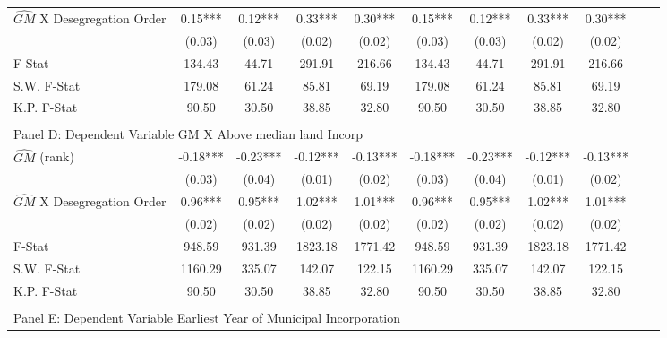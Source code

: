 \begin{table}[htbp]
\begin{threeparttable}
\begin{tabular}{l*{10}{c}}
\addlinespace
$\hat{GM}$ X Desegregation Order&       0.15***&       0.12***&       0.33***&       0.30***&       0.15***&       0.12***&       0.33***&       0.30***\\
                &     (0.03)   &     (0.03)   &     (0.02)   &     (0.02)   &     (0.03)   &     (0.03)   &     (0.02)   &     (0.02)   \\
\midrule
F-Stat          &     134.43   &      44.71   &     291.91   &     216.66   &     134.43   &      44.71   &     291.91   &     216.66   \\
S.W. F-Stat     &     179.08   &      61.24   &      85.81   &      69.19   &     179.08   &      61.24   &      85.81   &      69.19   \\
K.P. F-Stat     &      90.50   &      30.50   &      38.85   &      32.80   &      90.50   &      30.50   &      38.85   &      32.80   \\
\cmidrule[\heavyrulewidth](lr){1-9} \\ \cmidrule[\heavyrulewidth](lr){1-9}
\multicolumn{8}{l}{Panel D: Dependent Variable GM X Above median land Incorp}\\
\cmidrule(lr){1-9}
$\hat{GM}$ (rank)&      -0.18***&      -0.23***&      -0.12***&      -0.13***&      -0.18***&      -0.23***&      -0.12***&      -0.13***\\
                &     (0.03)   &     (0.04)   &     (0.01)   &     (0.02)   &     (0.03)   &     (0.04)   &     (0.01)   &     (0.02)   \\
\addlinespace
$\hat{GM}$ X Desegregation Order&       0.96***&       0.95***&       1.02***&       1.01***&       0.96***&       0.95***&       1.02***&       1.01***\\
                &     (0.02)   &     (0.02)   &     (0.02)   &     (0.02)   &     (0.02)   &     (0.02)   &     (0.02)   &     (0.02)   \\
\midrule
F-Stat          &     948.59   &     931.39   &    1823.18   &    1771.42   &     948.59   &     931.39   &    1823.18   &    1771.42   \\
S.W. F-Stat     &    1160.29   &     335.07   &     142.07   &     122.15   &    1160.29   &     335.07   &     142.07   &     122.15   \\
K.P. F-Stat     &      90.50   &      30.50   &      38.85   &      32.80   &      90.50   &      30.50   &      38.85   &      32.80   \\
\cmidrule[\heavyrulewidth](lr){1-9} \\ \cmidrule[\heavyrulewidth](lr){1-9}
\multicolumn{8}{l}{Panel E: Dependent Variable Earliest Year of Municipal Incorporation}\\

\end{tabular}
\end{threeparttable}
\end{table}
